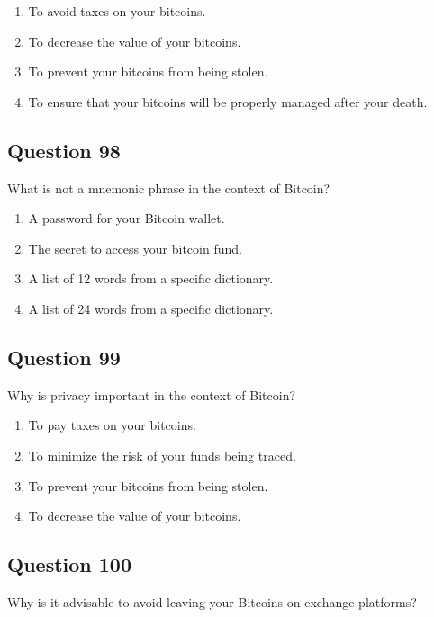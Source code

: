 \documentclass[12pt,a4paper]{article}
\begin{document}
\begin{enumerate}[label=\Alph*., leftmargin=*]
\item To avoid taxes on your bitcoins.
\item To decrease the value of your bitcoins.
\item To prevent your bitcoins from being stolen.
\item To ensure that your bitcoins will be properly managed after your death.
\end{enumerate}

\bigskip


\subsection*{Question 98}
What is not a mnemonic phrase in the context of Bitcoin?

\begin{enumerate}[label=\Alph*., leftmargin=*]
\item A password for your Bitcoin wallet.
\item The secret to access your bitcoin fund.
\item A list of 12 words from a specific dictionary.
\item A list of 24 words from a specific dictionary.
\end{enumerate}

\bigskip


\subsection*{Question 99}
Why is privacy important in the context of Bitcoin?

\begin{enumerate}[label=\Alph*., leftmargin=*]
\item To pay taxes on your bitcoins.
\item To minimize the risk of your funds being traced.
\item To prevent your bitcoins from being stolen.
\item To decrease the value of your bitcoins.
\end{enumerate}

\bigskip


\subsection*{Question 100}
Why is it advisable to avoid leaving your Bitcoins on exchange platforms?
\end{document}
